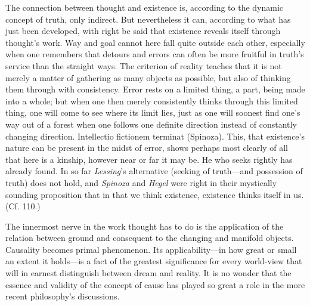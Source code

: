 \documentclass[12pt,a4paper]{book}
\newcommand{\opage}[1]{\marginnote{\footnotesize\textit{[#1]}}}
\begin{document}
The connection between thought and existence is, according to the dynamic concept of truth, only
indirect. But nevertheless it can, according to what has just been developed, with right be said
that existence reveals itself through thought's work. Way and goal cannot here fall quite outside
each other, especially when one remembers that detours and errors can often be more fruitful in
truth's service than the straight ways. The criterion of reality teaches that it is not merely a
matter of gathering as many objects as possible, but also of thinking them through with
consistency. Error rests on a limited thing, a part, being made into a whole; but when one then
merely \opage{320}consistently thinks through this limited thing, one will come to see where its limit lies,
just as one will soonest find one's way out of a forest when one follows one definite direction
instead of constantly changing direction. Intellectio fictionem terminat (Spinoza). This, that
existence's nature can be present in the midst of error, shows perhaps most clearly of all that
here is a kinship, however near or far it may be. He who seeks rightly has already found. In so far
\emph{Lessing}'s alternative (seeking of truth---and possession of truth) does not hold, and
\emph{Spinoza} and \emph{Hegel} were right in their mystically sounding proposition that in that
we think existence, existence thinks itself in us. (Cf. 110.)

The innermost nerve in the work thought has to do is the application of the relation between ground
and consequent to the changing and manifold objects. Causality becomes primal phenomenon. Its
applicability---in how great or small an extent it holds---is a fact of the greatest significance
for every world-view that will in earnest distinguish between dream and reality. It is no wonder
that the essence and validity of the concept of cause has played so great a role in the more recent
philosophy's discussions.
\end{document}
